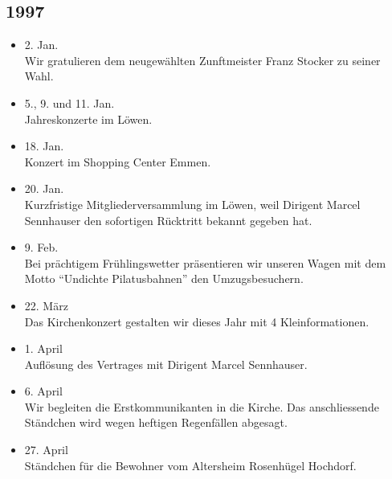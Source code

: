 \subsection*{1997}

\begin{history}


    \begin{itemize}

        \item 2. Jan.\\
              Wir gratulieren dem neugewählten Zunftmeister Franz Stocker zu seiner
              Wahl.

        \item 5., 9. und 11. Jan.\\
              Jahreskonzerte im Löwen.

        \item 18. Jan.\\
              Konzert im Shopping Center Emmen.

        \item 20. Jan.\\
              Kurzfristige Mitgliederversammlung im Löwen, weil Dirigent Marcel
              Sennhauser den sofortigen Rücktritt bekannt gegeben hat.

        \item 9. Feb.\\
              Bei prächtigem Frühlingswetter präsentieren wir unseren Wagen mit dem
              Motto \enquote{Undichte Pilatusbahnen} den Umzugsbesuchern.

        \item 22. März\\
              Das Kirchenkonzert gestalten wir dieses Jahr mit 4 Kleinformationen.

        \item 1. April\\
              Auflösung des Vertrages mit Dirigent Marcel Sennhauser.

        \item 6. April\\
              Wir begleiten die Erstkommunikanten in die Kirche. Das anschliessende
              Ständchen wird wegen heftigen Regenfällen abgesagt.

        \item 27. April\\
              Ständchen für die Bewohner vom Altersheim Rosenhügel Hochdorf.


\end{itemize}
\end{history}

